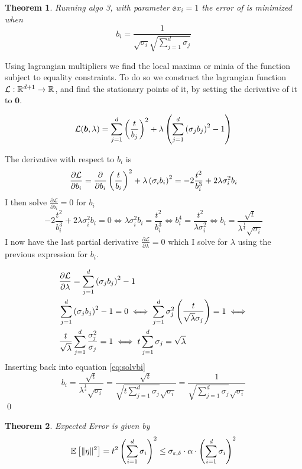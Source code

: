 \documentclass[a4paper,12pt]{article}
\renewenvironment{proof}{{\textit{Proof} \\}}{\qed}
\newtheorem{theorem}{Theorem}
\begin{document}
\begin{theorem}
Running algo 3, with parameter $\ee{x_i} = 1$ the error of is minimized when 
\[
    b_i = \frac{1}{\sqrt{\sigma_i} \sqrt{\sum_{j=1}^d \sigma_j}}
\]
\end{theorem}
\begin{proof}
Using lagrangian multipliers we find the local maxima or 
minia of the function subject to equality constraints.
To do so we construct the lagrangian function $\mathcal{L}: \mathbb{R}^{d+1} \rightarrow \mathbb{R}$, and find the stationary
points of it, by setting the derivative of it to $\bm{0}$.

\[
    \mathcal{L}(\bm{b},\lambda) = \sum_{j = 1}^{d} \left (\frac{t}{b_j}\right)^2 
    + \lambda \left ( \sum_{j=1}^d \left (\sigma_j b_j\right)^2 - 1\right)
\]

The derivative with respect to $b_i$ is 
\[
    \frac{\partial \mathcal{L}}{\partial b_i} = 
    \frac{\partial}{\partial b_i} \left (\frac{t}{b_i}\right)^2
    + \lambda \left (\sigma_i b_i\right)^2 =
    -2\frac{t^2}{b_i^3} + 2 \lambda \sigma_i^2b_i
\]
I then solve $\frac{\partial \mathcal{L}}{\partial b_i} = 0$ for $b_i$
\begin{equation}
\label{eq:solvbi}
    -2\frac{t^2}{b_i^3} + 2 \lambda \sigma_i^2b_i = 0 \iff
    \lambda \sigma_i^2b_i = \frac{t^2}{b_i^3} \iff 
    b_i^4 = \frac{t^2}{\lambda \sigma_i^2} \iff 
    b_i = \frac{\sqrt{t}}{\lambda^{\frac{1}{4}} \sqrt{\sigma_i}} 
\end{equation}
I now have the last partial derivative 
$\frac{\partial \mathcal{L}}{\partial \lambda} = 0$ which I solve for
$\lambda$ using the previous expression for $b_i$.

\begin{align*}
    &\frac{\partial \mathcal{L}}{\partial \lambda} = 
    \sum_{j=1}^d \left ( \sigma_j b_j\right)^2 - 1 \\
    &\sum_{j=1}^d \left ( \sigma_j b_j\right)^2 - 1 = 0 \iff
    \sum_{j=1}^d \sigma_j^2 \left (\frac{t}{\sqrt{\lambda}\sigma_j}\right) = 1 \iff \\
    &\frac{t}{\sqrt{\lambda}} \sum_{j=1}^d \frac{\sigma_j^2}{\sigma_j} = 1 \iff
    t \sum_{j=1}^d \sigma_j = \sqrt{\lambda}
\end{align*}
Inserting back into equation \ref{eq:solvbi}
\[
    b_i = \frac{\sqrt{t}}{\lambda^{\frac{1}{4}} \sqrt{\sigma_i}} =
    \frac{\sqrt{t}}{\sqrt{t \sum_{j=1}^d \sigma_j} \sqrt{\sigma_i}} = 
    \frac{1}{\sqrt{\sum_{j=1}^d \sigma_j} \sqrt{\sigma_i}} 
\]
\end{proof}
\begin{theorem}
    Expected Error is given by
    \[
        \mathbb{E} \left [ \| \eta \|^2 \right] = t^2 \left (\sum_{i=1}^d \sigma_i\right)^2 \le \sigma_{\varepsilon,\delta}  \cdot \alpha \cdot \left (\sum_{i=1}^d \sigma_i\right)^2
    \]
\end{theorem}
\end{document}
